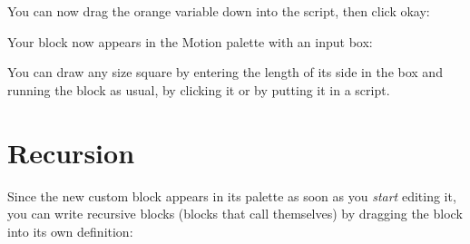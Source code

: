 \documentclass{report}
\begin{document}

You can now drag the orange variable down into the script, then click okay:\nopagebreak


Your block now appears in the Motion palette with an input box:\nopagebreak


You can draw any size square by entering the length of its side in the box and running the block as usual, by clicking it or by putting it in a script.

\section{Recursion}

Since the new custom block appears in its palette as soon as you \emph{start} editing it, you can write recursive blocks (blocks that call themselves) by dragging the block into its own definition:\nopagebreak
\end{document}
